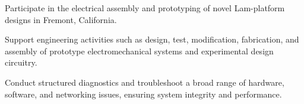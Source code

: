 \begin{tightemize}
    \item Participate in the electrical assembly and prototyping of novel Lam-platform designs in Fremont, California.
    \item Support engineering activities such as design, test, modification, fabrication, and assembly of prototype electromechanical systems and experimental design circuitry.
    \item Conduct structured diagnostics and troubleshoot a broad range of hardware, software, and networking issues, ensuring system integrity and performance.
\end{tightemize}